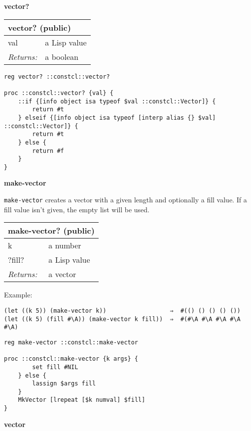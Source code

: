 \documentclass{report}
\begin{document}
\textbf{vector?}

\begin{tabular}{ |l l| }
\hline
\multicolumn{2}{|l|}{vector? (public)} \\
\hline
val & a Lisp value \\
\textit{Returns:} & a boolean \\
\hline
\end{tabular}

\noindent\makebox[\linewidth]{\rule{\linewidth}{0.4pt}}
\begin{lstlisting}
reg vector? ::constcl::vector?
 
proc ::constcl::vector? {val} {
    ::if {[info object isa typeof $val ::constcl::Vector]} {
        return #t
    } elseif {[info object isa typeof [interp alias {} $val] ::constcl::Vector]} {
        return #t
    } else {
        return #f
    }
}
\end{lstlisting}
\noindent\makebox[\linewidth]{\rule{\linewidth}{0.4pt}}

\textbf{make-vector}


\texttt{make-vector} creates a vector with a given length and optionally a fill value. If a fill value isn't given, the empty list will be used.

\begin{tabular}{ |l l| }
\hline
\multicolumn{2}{|l|}{make-vector? (public)} \\
\hline
k & a number \\
?fill? & a Lisp value \\
\textit{Returns:} & a vector \\
\hline
\end{tabular}


Example:

\noindent\makebox[\linewidth]{\rule{\linewidth}{0.4pt}}
\begin{lstlisting}
(let ((k 5)) (make-vector k))                  ⇒  #(() () () () ())
(let ((k 5) (fill #\A)) (make-vector k fill))  ⇒  #(#\A #\A #\A #\A #\A)
\end{lstlisting}
\noindent\makebox[\linewidth]{\rule{\linewidth}{0.4pt}}
\noindent\makebox[\linewidth]{\rule{\linewidth}{0.4pt}}
\begin{lstlisting}
reg make-vector ::constcl::make-vector
 
proc ::constcl::make-vector {k args} {
        set fill #NIL
    } else {
        lassign $args fill
    }
    MkVector [lrepeat [$k numval] $fill]
}
\end{lstlisting}
\noindent\makebox[\linewidth]{\rule{\linewidth}{0.4pt}}

\textbf{vector}
\end{document}
